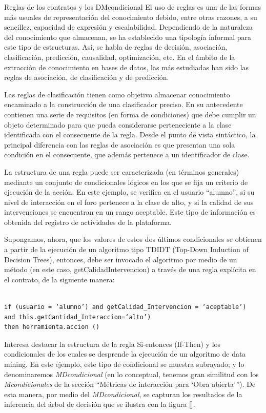 Reglas de los contratos y los DMcondicional El uso de reglas es una de las
formas más usuales de representación del conocimiento debido, entre otras
razones, a su sencillez, capacidad de expresión y escalabilidad. Dependiendo de
la naturaleza del conocimiento que almacenan, se ha establecido una tipología
informal para este tipo de estructuras. Así, se habla de reglas de decisión,
asociación, clasificación, predicción, causalidad, optimización, etc. En el
ámbito de la extracción de conocimiento en bases de datos, las más estudiadas
han sido las reglas de asociación, de clasificación y de predicción.


Las reglas de clasificación tienen como objetivo almacenar
conocimiento encaminado a la construcción de una clasificador preciso. En su
antecedente contienen una serie de requisitos (en forma de condiciones) que debe
cumplir un objeto determinado para que pueda considerarse perteneciente a la
clase identificada con el consecuente de la regla. Desde el punto de
vista sintáctico, la principal diferencia con las reglas de asociación es que 
presentan una sola condición en el consecuente, que además pertenece a un
identificador de clase.


La estructura de una regla puede ser caracterizada (en términos
generales) mediante un conjunto de condicionales lógicos en los que se fija un
criterio de ejecución de la acción. En este ejemplo, se verifica en el usuario
“alumno”, si su nivel de interacción en el foro pertenece a la clase de alto, y
si la calidad de sus intervenciones se encuentran en un rango aceptable. Este
tipo de información es obtenida del registro de actividades de la plataforma.


Supongamos, ahora, que los valores de estos dos últimos condicionales se
obtienen a partir de la ejecución de un algoritmo tipo TDIDT (Top-Down Induction
of Decision Trees), entonces, debe ser invocado el algoritmo por medio de un
método (en este caso, getCalidadIntervencion) a través de una regla explícita
en el contrato, de la siguiente manera:

\begin{verbatim}

if (usuario = ‘alumno’) and getCalidad_Intervencion = ‘aceptable’)
and this.getCantidad_Interaccion=‘alto’)
then herramienta.accion ()

\end{verbatim} 

Interesa destacar la estructura de la regla Si-entonces (If-Then) y los condicionales
de los cuales se desprende la ejecución de un algoritmo de data mining.
En este ejemplo, este tipo de condicional se muestra subrayado; y lo denominaremos
\textit{MDcondicional} (en lo conceptual, tenemos gran similitud con los
\textit{Mcondicionales} de la sección “Métricas de interacción para ‘Obra
abierta’”). De esta manera, por medio del \textit{MDcondicional}, se capturan
los resultados de la inferencia del árbol de decisión que se ilustra con la
figura \ref{}.

